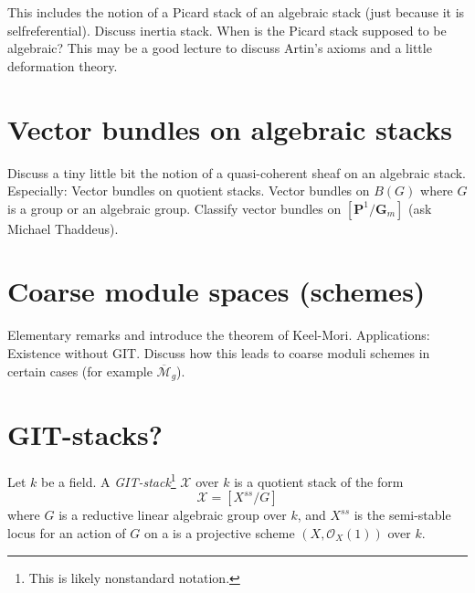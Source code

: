 \noindent
This includes the notion of a Picard stack of an algebraic stack
(just because it is selfreferential). Discuss inertia stack.
When is the Picard stack supposed to be algebraic? This may be a good
lecture to discuss Artin's axioms and a little deformation theory.

\section{Vector bundles on algebraic stacks}
\label{section-vectorbundles}

\noindent
Discuss a tiny little bit the notion of a quasi-coherent sheaf on
an algebraic stack. Especially: Vector bundles on quotient stacks.
Vector bundles on $B(G)$ where $G$ is a group or an algebraic group.
Classify vector bundles on $[\mathbf{P}^1/\mathbf{G}_m]$
(ask Michael Thaddeus).


\section{Coarse module spaces (schemes)}
\label{section-coarse}

\noindent
Elementary remarks and introduce the theorem of Keel-Mori.
Applications: Existence without GIT. Discuss how this leads to
coarse moduli schemes in certain cases (for example
$\overline{\mathcal{M}}_g$).


\section{GIT-stacks?}
\label{section-GIT}

\begin{definition}
\label{definition-GIT-stack}
Let $k$ be a field.
A {\it GIT-stack}\footnote{This is likely nonstandard notation.}
$\mathcal{X}$ over $k$ is a quotient stack of the form
$$
\mathcal{X} = [X^{ss}/G]
$$
where $G$ is a reductive linear algebraic group over $k$,
and $X^{ss}$ is the semi-stable locus for an action of $G$ on
a is a projective scheme $(X, \mathcal{O}_X(1))$ over $k$.
\end{definition}

